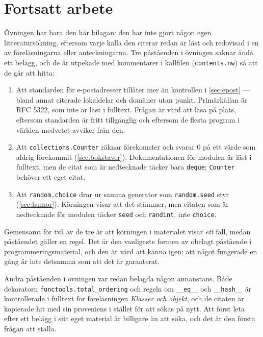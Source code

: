 \section{Fortsatt arbete}
\label{sec:ovning-fortsatt}

Övningen har bara den här bilagan: den har inte gjort någon egen
litteratursökning, eftersom varje källa den citerar redan är läst och
redovisad i en av föreläsningarna eller anteckningarna.  Tre påståenden
i övningen saknar ändå ett belägg, och de är utpekade med kommentarer i
källfilen (\texttt{contents.nw}) så att de går att hitta:
\begin{enumerate}
  \item Att standarden för e-postadresser tillåter mer än kontrollen i
    \cref{sec:epost} --- bland annat citerade lokaldelar och domäner
    utan punkt.  Primärkällan är RFC 5322, som inte är läst i fulltext.
    Frågan är värd att läsa på plats, eftersom standarden är fritt
    tillgänglig och eftersom de flesta program i världen medvetet
    avviker från den.
  \item Att \texttt{collections.Counter} räknar förekomster
    och svarar \(0\) på ett värde som aldrig förekommit
    (\cref{sec:bokstaver}).  Dokumentationen för modulen är läst i
    fulltext, men de citat som är nedtecknade täcker bara
    \texttt{deque}; \texttt{Counter} behöver ett
    eget citat.
  \item Att \texttt{random.choice} drar ur samma generator
    som \texttt{random.seed} styr (\cref{sec:humor}).
    Körningen visar att det stämmer, men citaten som är nedtecknade för
    modulen täcker \texttt{seed} och
    \texttt{randint}, inte \texttt{choice}.
\end{enumerate}
Gemensamt för två av de tre är att körningen i materialet visar
\emph{ett} fall, medan påståendet gäller en regel.  Det är den vanligaste
formen av obelagt påstående i programmeringsmaterial, och den är värd att
känna igen: att något fungerade en gång är inte detsamma som att det är
garanterat.

Andra påståenden i övningen var redan belagda någon annanstans.  Både
dekoratorn \texttt{functools.total_ordering} och regeln om
\texttt{__eq__} och \texttt{__hash__} är
kontrollerade i fulltext för föreläsningen \emph{Klasser och objekt}, och
de citaten är kopierade hit med sin proveniens i stället för att sökas
på nytt.  Att först leta efter ett belägg i sitt eget material är
billigare än att söka, och det är den första frågan att ställa.

